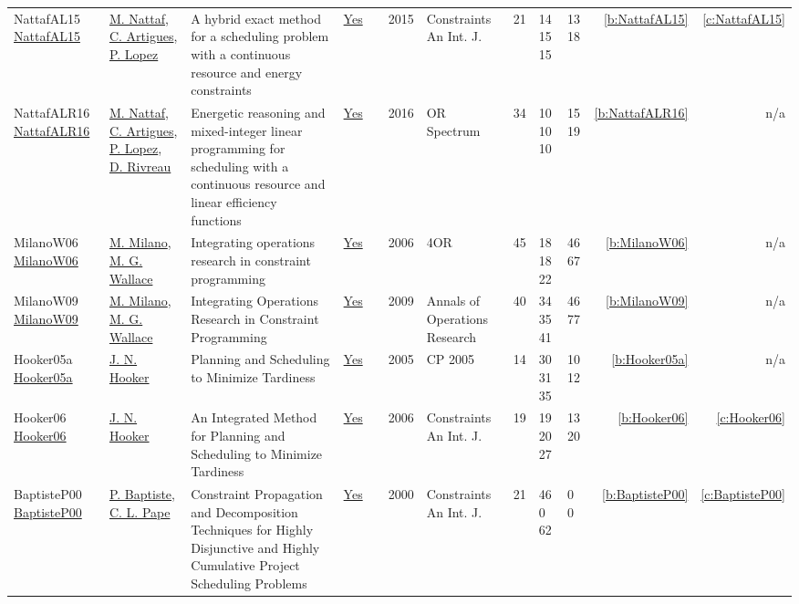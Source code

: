 {\begin{longtable}{>{\raggedright\arraybackslash}p{3cm}>{\raggedright\arraybackslash}p{4.5cm}>{\raggedright\arraybackslash}p{6.0cm}rrrp{2.5cm}rp{1cm}p{1cm}rr}
NattafAL15 \href{https://doi.org/10.1007/s10601-015-9192-z}{NattafAL15} & \hyperref[auth:a81]{M. Nattaf}, \hyperref[auth:a6]{C. Artigues}, \hyperref[auth:a3]{P. Lopez} & \cellcolor{green!10}A hybrid exact method for a scheduling problem with a continuous resource and energy constraints & \href{../works/NattafAL15.pdf}{Yes} & \cite{NattafAL15} & 2015 & Constraints An Int. J. & 21 & 14 15 15 & 13 18 & \ref{b:NattafAL15} & \ref{c:NattafAL15}\\
NattafALR16 \href{https://doi.org/10.1007/s00291-015-0423-x}{NattafALR16} & \hyperref[auth:a81]{M. Nattaf}, \hyperref[auth:a6]{C. Artigues}, \hyperref[auth:a3]{P. Lopez}, \hyperref[auth:a980]{D. Rivreau} & \cellcolor{green!10}Energetic reasoning and mixed-integer linear programming for scheduling with a continuous resource and linear efficiency functions & \href{../works/NattafALR16.pdf}{Yes} & \cite{NattafALR16} & 2016 & {OR} Spectrum & 34 & 10 10 10 & 15 19 & \ref{b:NattafALR16} & n/a\\
MilanoW06 \href{http://dx.doi.org/10.1007/s10288-006-0019-z}{MilanoW06} & \hyperref[auth:a143]{M. Milano}, \hyperref[auth:a117]{M. G. Wallace} & Integrating operations research in constraint programming & \href{../works/MilanoW06.pdf}{Yes} & \cite{MilanoW06} & 2006 & 4OR & 45 & 18 18 22 & 46 67 & \ref{b:MilanoW06} & n/a\\
MilanoW09 \href{http://dx.doi.org/10.1007/s10479-009-0654-9}{MilanoW09} & \hyperref[auth:a143]{M. Milano}, \hyperref[auth:a117]{M. G. Wallace} & Integrating Operations Research in Constraint Programming & \href{../works/MilanoW09.pdf}{Yes} & \cite{MilanoW09} & 2009 & Annals of Operations Research & 40 & 34 35 41 & 46 77 & \ref{b:MilanoW09} & n/a\\
Hooker05a \href{https://doi.org/10.1007/11564751_25}{Hooker05a} & \hyperref[auth:a160]{J. N. Hooker} & \cellcolor{green!10}Planning and Scheduling to Minimize Tardiness & \href{../works/Hooker05a.pdf}{Yes} & \cite{Hooker05a} & 2005 & CP 2005 & 14 & 30 31 35 & 10 12 & \ref{b:Hooker05a} & n/a\\
Hooker06 \href{https://doi.org/10.1007/s10601-006-8060-2}{Hooker06} & \hyperref[auth:a160]{J. N. Hooker} & \cellcolor{green!10}An Integrated Method for Planning and Scheduling to Minimize Tardiness & \href{../works/Hooker06.pdf}{Yes} & \cite{Hooker06} & 2006 & Constraints An Int. J. & 19 & 19 20 27 & 13 20 & \ref{b:Hooker06} & \ref{c:Hooker06}\\
BaptisteP00 \href{https://doi.org/10.1023/A:1009822502231}{BaptisteP00} & \hyperref[auth:a162]{P. Baptiste}, \hyperref[auth:a163]{C. L. Pape} & Constraint Propagation and Decomposition Techniques for Highly Disjunctive and Highly Cumulative Project Scheduling Problems & \href{../works/BaptisteP00.pdf}{Yes} & \cite{BaptisteP00} & 2000 & Constraints An Int. J. & 21 & 46 0 62 & 0 0 & \ref{b:BaptisteP00} & \ref{c:BaptisteP00}\\

\end{longtable}}
